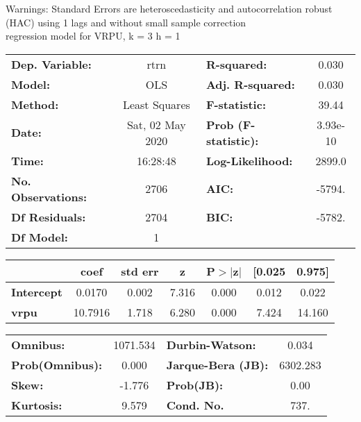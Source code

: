 Warnings: \newline
 [1] Standard Errors are heteroscedasticity and autocorrelation robust (HAC) using 1 lags and without small sample correction\\ 

regression model for VRPU, k = 3 h = 1\begin{center}
\begin{tabular}{lclc}
\toprule
\textbf{Dep. Variable:}    &       rtrn       & \textbf{  R-squared:         } &     0.030   \\
\textbf{Model:}            &       OLS        & \textbf{  Adj. R-squared:    } &     0.030   \\
\textbf{Method:}           &  Least Squares   & \textbf{  F-statistic:       } &     39.44   \\
\textbf{Date:}             & Sat, 02 May 2020 & \textbf{  Prob (F-statistic):} &  3.93e-10   \\
\textbf{Time:}             &     16:28:48     & \textbf{  Log-Likelihood:    } &    2899.0   \\
\textbf{No. Observations:} &        2706      & \textbf{  AIC:               } &    -5794.   \\
\textbf{Df Residuals:}     &        2704      & \textbf{  BIC:               } &    -5782.   \\
\textbf{Df Model:}         &           1      & \textbf{                     } &             \\
\bottomrule
\end{tabular}
\begin{tabular}{lcccccc}
                   & \textbf{coef} & \textbf{std err} & \textbf{z} & \textbf{P$> |$z$|$} & \textbf{[0.025} & \textbf{0.975]}  \\
\midrule
\textbf{Intercept} &       0.0170  &        0.002     &     7.316  &         0.000        &        0.012    &        0.022     \\
\textbf{vrpu}      &      10.7916  &        1.718     &     6.280  &         0.000        &        7.424    &       14.160     \\
\bottomrule
\end{tabular}
\begin{tabular}{lclc}
\textbf{Omnibus:}       & 1071.534 & \textbf{  Durbin-Watson:     } &    0.034  \\
\textbf{Prob(Omnibus):} &   0.000  & \textbf{  Jarque-Bera (JB):  } & 6302.283  \\
\textbf{Skew:}          &  -1.776  & \textbf{  Prob(JB):          } &     0.00  \\
\textbf{Kurtosis:}      &   9.579  & \textbf{  Cond. No.          } &     737.  \\
\bottomrule
\end{tabular}
\end{center}

